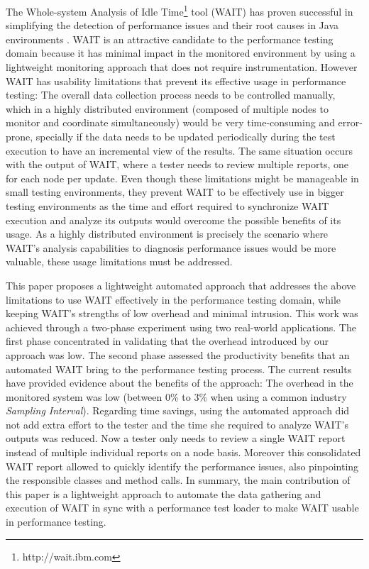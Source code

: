 \documentclass[runningheads,a4paper]{llncs}
\begin{document}
The Whole-system Analysis of Idle Time\footnote{http://wait.ibm.com} tool (WAIT)
has proven successful in simplifying the detection of performance issues and
their root causes in Java environments \cite{Altman2010,Wu1}. WAIT is an
attractive candidate to the performance testing domain because it has minimal
impact in the monitored environment by using a lightweight monitoring approach
that does not require instrumentation. However WAIT has usability limitations
that prevent its effective usage in performance testing: The overall data
collection process needs to be controlled manually, which in a highly
distributed environment (composed of multiple nodes to monitor and coordinate
simultaneously) would be very time-consuming and error-prone, specially if the
data needs to be updated periodically during the test execution to have an
incremental view of the results. The same situation occurs with the output of
WAIT, where a tester needs to review multiple reports, one for each node per
update. Even though these limitations might be manageable in small testing
environments, they prevent WAIT to be effectively use in bigger testing
environments as the time and effort required to synchronize WAIT execution and
analyze its outputs would overcome the possible benefits of its usage. As a
highly distributed environment is precisely the scenario where WAIT's analysis
capabilities to diagnosis performance issues would be more valuable, these usage
limitations must be addressed.

This paper proposes a lightweight automated approach that addresses the above
limitations to use WAIT effectively in the performance testing domain,
while keeping WAIT's strengths of low overhead and minimal intrusion. This work
was achieved through a two-phase experiment using two real-world applications. The first
phase concentrated in validating that the overhead introduced by our
approach was low. The second phase assessed the productivity benefits that
an automated WAIT bring to the performance testing process. The current results
have provided evidence about the benefits of the approach: The overhead in the
monitored system was low (between 0\% to 3\% when using a common industry \emph{Sampling Interval}).
Regarding time savings, using the automated approach did not add extra effort to
the tester and the time she required to analyze WAIT's outputs was reduced. Now
a tester only needs to review a single WAIT report instead of multiple
individual reports on a node basis. Moreover this consolidated WAIT report
allowed to quickly identify the performance issues, also pinpointing
the responsible classes and method calls. In summary, the main contribution
of this paper is a lightweight approach to automate the data gathering and
execution of WAIT in sync with a performance test loader to make WAIT usable in
performance testing.
\end{document}
